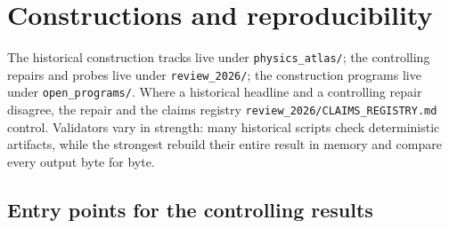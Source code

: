 \section{Constructions and reproducibility}\label{toy-constructions-reproducibility}

The historical construction tracks live under \nolinkurl{physics_atlas/}; the controlling repairs and probes live under
\nolinkurl{review_2026/}; the construction programs live under \nolinkurl{open_programs/}. Where a historical headline
and a controlling repair disagree, the repair and the claims registry \nolinkurl{review_2026/CLAIMS_REGISTRY.md}
control. Validators vary in strength: many historical scripts check deterministic artifacts, while the strongest
rebuild their entire result in memory and compare every output byte for byte.

\subsection{Entry points for the controlling results}

